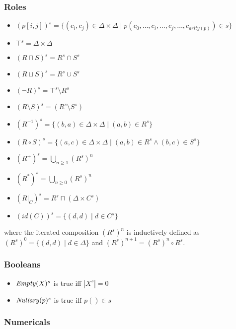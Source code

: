 \documentclass{article}
\begin{document}
\subsubsection{Roles}

\begin{itemize}
    \item $(p[i,j])^s = \{(c_i,c_j)\in\Delta\times\Delta\mid p(c_0,\ldots,c_i,\ldots,c_j,\ldots,c_{\mathit{arity}(p)})\in s \}$
    \item $\top^s = \Delta\times\Delta$
    \item $(R\sqcap S)^s = R^s\cap S^s$
    \item $(R\sqcup S)^s = R^s\cup S^s$
    \item $(\neg R)^s = \top^s\setminus R^s$
    \item $(R\setminus S)^s = (R^s\setminus S^s)$
    \item $(R^{-1})^s = \{(b,a)\in\Delta\times\Delta\mid (a,b)\in R^s\}$
    \item $(R\circ S)^s = \{(a,c)\in\Delta\times\Delta\mid (a,b)\in R^s\land (b,c)\in S^s \}$
    \item $(R^+)^s = \bigcup_{n\geq 1}(R^s)^n$
    \item $(R^*)^s = \bigcup_{n\geq 0}(R^s)^n$
    \item $(R\vert_{C})^s = R^s\sqcap (\Delta\times C^s)$
    \item $(\mathit{id}(C))^s = \{(d,d)\mid d\in C^s \}$
\end{itemize}

where the iterated composition $(R^s)^n$ is inductively defined as
$(R^s)^0 = \{(d,d)\mid d\in\Delta\}$ and $(R^s)^{n+1} = (R^s)^n\circ R^s$.

\subsubsection{Booleans}

\begin{itemize}
    \item $\mathit{Empty}(X)^s$ is true iff $|X^s| = 0$
    \item $\mathit{Nullary}(p)^s$ is true iff $p()\in s$
\end{itemize}

\subsubsection{Numericals}
\end{document}
